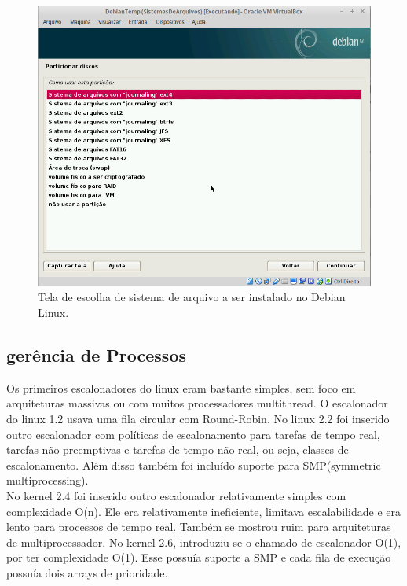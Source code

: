 \documentclass[conference]{IEEEtran}
\begin{document}
\begin{figure}[h!]
	\centering
	\includegraphics[scale=0.3]{SistemasArquivosLinux.jpeg}
	\caption{Tela de escolha de sistema de arquivo a ser instalado no Debian Linux.}
	\label{fig:SisAqrLinux}
\end{figure}
\subsection{gerência de Processos}\label{sec:LinuxPROC}

Os primeiros escalonadores do linux eram bastante simples, sem foco em arquiteturas massivas ou com muitos processadores multithread. O escalonador do linux 1.2 usava uma fila circular com Round-Robin. No linux 2.2 foi inserido outro escalonador com políticas de escalonamento para tarefas de tempo real, tarefas não preemptivas e tarefas de tempo não real, ou seja,  classes de escalonamento. Além disso também foi incluído suporte para SMP(symmetric multiprocessing)\cite{LinuxSchedulerIBM}.\\

 No kernel 2.4 foi  inserido outro escalonador relativamente simples com complexidade O(n). Ele era relativamente ineficiente, limitava escalabilidade e era lento para processos de tempo real. Também se mostrou ruim para arquiteturas de multiprocessador. No kernel 2.6, introduziu-se o chamado de escalonador O(1), por ter complexidade O(1). Esse possuía suporte a SMP e cada fila de execução possuía dois arrays de prioridade.\\
\end{document}
